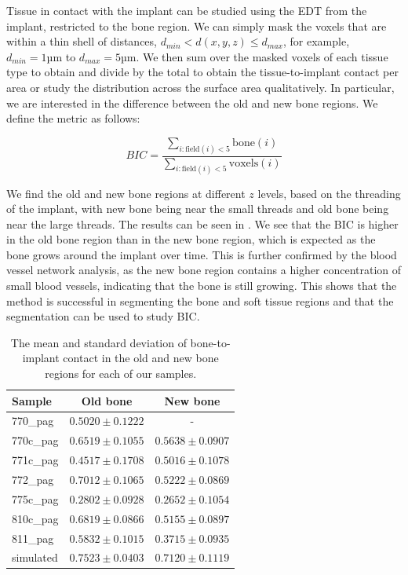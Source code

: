 Tissue in contact with the implant can be studied using the EDT from the
implant, restricted to the bone region. We can simply mask the voxels that are
within a thin shell of distances, $d_{min} < d(x,y,z) \le d_{max}$, for
example, $d_{min} = 1 \text{µm}$ to $d_{max} = 5 \text{µm}$. We then sum over
the masked voxels of each tissue type to obtain and divide by the total to
obtain the tissue-to-implant contact per area or study the distribution across
the surface area qualitatively. In particular, we are interested in the
difference between the old and new bone regions. We define the metric as
follows:

\begin{equation}
    BIC = \frac{\sum_{i : \text{field}(i) < 5} \text{bone}(i)}{\sum_{i : \text{field}(i) < 5} \text{voxels}(i)}
\end{equation}

We find the old and new bone regions at different $z$ levels, based on the
threading of the implant, with new bone being near the small threads and old
bone being near the large threads. The results can be seen in .
We see that the BIC is higher in the old bone region than in the new bone
region, which is expected as the bone grows around the implant over time. This
is further confirmed by the blood vessel network analysis, as the new bone
region contains a higher concentration of small blood vessels, indicating that
the bone is still growing. This shows that the method is successful in
segmenting the bone and soft tissue regions and that the segmentation can be
used to study BIC.

\begin{table}
    \caption{The mean and standard deviation of bone-to-implant contact in the
    old and new bone regions for each of our samples.}
    \label{tab:bic}
    \centering
    \begin{tabular}{lcc}
        \toprule
        Sample & Old bone & New bone \\
        \midrule
        770\_pag & $0.5020 \pm 0.1222$ & - \\
        770c\_pag & $0.6519 \pm 0.1055$ & $0.5638 \pm 0.0907$ \\
        771c\_pag & $0.4517 \pm 0.1708$ & $0.5016 \pm 0.1078$ \\
        772\_pag & $0.7012 \pm 0.1065$ & $0.5222 \pm 0.0869$ \\
        775c\_pag & $0.2802 \pm 0.0928$ & $0.2652 \pm 0.1054$ \\
        810c\_pag & $0.6819 \pm 0.0866$ & $0.5155 \pm 0.0897$ \\
        811\_pag & $0.5832 \pm 0.1015$ & $0.3715 \pm 0.0935$ \\
	simulated & $0.7523 \pm 0.0403$ & $0.7120 \pm 0.1119$ \\
        \bottomrule
    \end{tabular}
\end{table}

